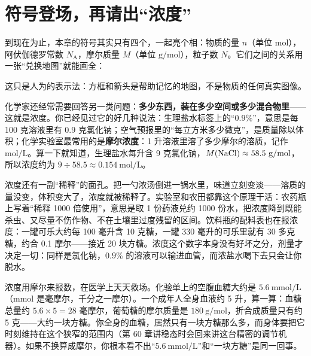 \section{符号登场，再请出“浓度”}

到现在为止，本章的符号其实只有四个，一起亮个相：物质的量 $n$（单位 mol），阿伏伽德罗常数 $N_{\mathrm{A}}$，摩尔质量 $M$（单位 $\mathrm{g/mol}$），粒子数 $N$。它们之间的关系用一张“兑换地图”就能画全：

\begin{center}
\end{center}

这只是人为的表示法：方框和箭头是帮助记忆的地图，不是物质的任何真实图像。

化学家还经常需要回答另一类问题：\textbf{多少东西，装在多少空间或多少混合物里}——这就是浓度。你已经见过它的好几种说法：生理盐水标签上的“$0.9\%$”，意思是每 100 克溶液里有 0.9 克氯化钠；空气预报里的“每立方米多少微克”，是质量除以体积；化学实验室最常用的是\textbf{摩尔浓度}：1 升溶液里溶了多少摩尔的溶质，记作 $\mathrm{mol/L}$。算一下就知道，生理盐水每升含 9 克氯化钠，$M(\chem{NaCl})\approx 58.5\ \mathrm{g/mol}$，所以浓度约为 $9\div 58.5\approx 0.154\ \mathrm{mol/L}$。

浓度还有一副“稀释”的面孔。把一勺浓汤倒进一锅水里，味道立刻变淡——溶质的量没变，体积变大了，浓度就被稀释了。实验室和农田都靠这个原理干活：农药瓶上写着“稀释 1000 倍使用”，意思是取 1 份药液兑约 1000 份水，把浓度降到既能杀虫、又尽量不伤作物、不在土壤里过度残留的区间。饮料瓶的配料表也在报浓度：一罐可乐大约每 100 毫升含 10 克糖，一罐 330 毫升的可乐里就有 30 多克糖，约合 0.1 摩尔——接近 20 块方糖。浓度这个数字本身没有好坏之分，剂量才决定一切：同样是氯化钠，$0.9\%$ 的溶液可以输进血管，而浓盐水喝下去只会让你脱水。

浓度用摩尔来报数，在医学上天天救场。化验单上的空腹血糖大约是 $5.6\ \mathrm{mmol/L}$（mmol 是毫摩尔，千分之一摩尔）。一个成年人全身血液约 5 升，算一算：血糖总量约 $5.6\times 5=28$ 毫摩尔，葡萄糖的摩尔质量是 $180\ \mathrm{g/mol}$，折合成质量只有约 5 克——大约一块方糖。你全身的血糖，居然只有一块方糖那么多，而身体要把它时刻维持在这个狭窄的范围内（第 60 章讲稳态时会回来讲这台精密的调节机器）。如果不换算成摩尔，你根本看不出“$5.6\ \mathrm{mmol/L}$”和“一块方糖”是同一回事。


